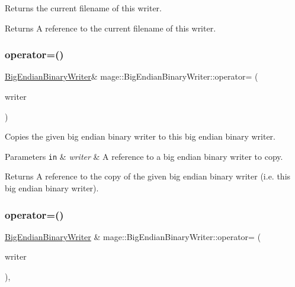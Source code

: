 Returns the current filename of this writer.

\begin{DoxyReturn}{Returns}
A reference to the current filename of this writer. 
\end{DoxyReturn}
\hypertarget{classmage_1_1_big_endian_binary_writer_ae574f7d0b630890256996c52818ba633}{}\label{classmage_1_1_big_endian_binary_writer_ae574f7d0b630890256996c52818ba633} 
\subsubsection{\texorpdfstring{operator=()}{operator=()}\hspace{0.1cm}{\footnotesize\ttfamily [1/2]}}
{\footnotesize\ttfamily \hyperlink{classmage_1_1_big_endian_binary_writer}{Big\+Endian\+Binary\+Writer}\& mage\+::\+Big\+Endian\+Binary\+Writer\+::operator= (\begin{DoxyParamCaption}\item[{const \hyperlink{classmage_1_1_big_endian_binary_writer}{Big\+Endian\+Binary\+Writer} \&}]{writer }\end{DoxyParamCaption})\hspace{0.3cm}{\ttfamily [delete]}}

Copies the given big endian binary writer to this big endian binary writer.


\begin{DoxyParams}[1]{Parameters}
\mbox{\tt in}  & {\em writer} & A reference to a big endian binary writer to copy. \\
\hline
\end{DoxyParams}
\begin{DoxyReturn}{Returns}
A reference to the copy of the given big endian binary writer (i.\+e. this big endian binary writer). 
\end{DoxyReturn}
\hypertarget{classmage_1_1_big_endian_binary_writer_a8c01bf43f5e941578c5c5947ea184a78}{}\label{classmage_1_1_big_endian_binary_writer_a8c01bf43f5e941578c5c5947ea184a78} 
\subsubsection{\texorpdfstring{operator=()}{operator=()}\hspace{0.1cm}{\footnotesize\ttfamily [2/2]}}
{\footnotesize\ttfamily \hyperlink{classmage_1_1_big_endian_binary_writer}{Big\+Endian\+Binary\+Writer} \& mage\+::\+Big\+Endian\+Binary\+Writer\+::operator= (\begin{DoxyParamCaption}\item[{\hyperlink{classmage_1_1_big_endian_binary_writer}{Big\+Endian\+Binary\+Writer} \&\&}]{writer }\end{DoxyParamCaption})\hspace{0.3cm}{\ttfamily [default]}, {\ttfamily [noexcept]}}

